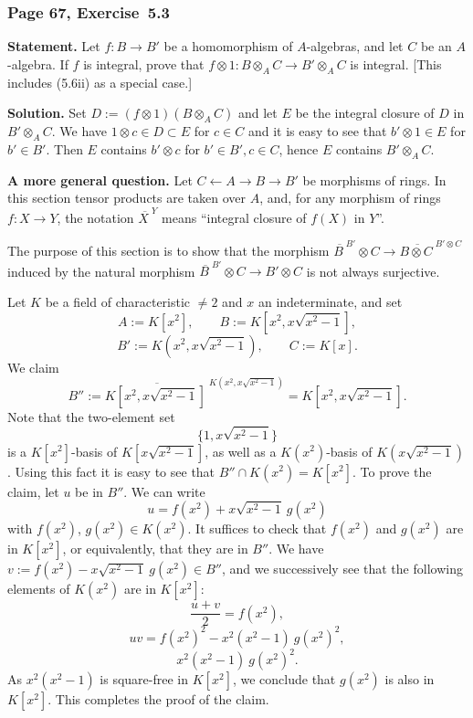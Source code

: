 \documentclass[12pt,letterpaper]{article}%
\newcommand{\nn}{\noindent}
\begin{document}
\subsubsection{Page 67, Exercise~5.3}\label{ex5.3}%

\textbf{Statement.} Let $f:B\to B'$ be a homomorphism of $A$-algebras, and let $C$ be an $A$-algebra. If $f$ is integral, prove that $f\otimes 1:B\otimes_AC\to B'\otimes_AC$ is integral. [This includes (5.6ii) as a special case.]

\nn\textbf{Solution.} Set $D:=(f\otimes1)(B\otimes_AC)$ and let $E$ be the integral closure of $D$ in $B'\otimes_AC$. We have $1\otimes c\in D\subset E$ for $c\in C$ and it is easy to see that $b'\otimes1\in E$ for $b'\in B'$. Then $E$ contains $b'\otimes c$ for $b'\in B',c\in C$, hence $E$ contains $B'\otimes_AC$.

\nn\textbf{A more general question.} Let $C\leftarrow A\to B\to B'$ be morphisms of rings. In this section tensor products are taken over $A$, and, for any morphism of rings $f:X\to Y$, the notation $\overline{X\ }^Y$ means ``integral closure of $f(X)$ in $Y$''. 

The purpose of this section is to show that the morphism $\overline{B\ }^{B'}\otimes C\to\overline{B\otimes C\ }^{B'\otimes C}$ induced by the natural morphism $\overline{B\ }^{B'}\otimes C\to B'\otimes C$ is not always surjective. 

Let $K$ be a field of characteristic $\ne2$ and $x$ an indeterminate, and set 
$$
A:=K[x^2],\qquad B:=K\left[x^2,x\sqrt{x^2-1}\right],
$$
$$
B':=K\left(x^2,x\sqrt{x^2-1}\right),\qquad C:=K[x].
$$ 
We claim 
$$
B'':=\overline{K\left[x^2,x\sqrt{x^2-1}\right]\ }^{K\left(x^2,x\sqrt{x^2-1}\right)}=K\left[x^2,x\sqrt{x^2-1}\right].
$$ 
Note that the two-element set 
$$
\{1,x\sqrt{x^2-1}\}
$$ 
is a $K[x^2]$-basis of $K[x\sqrt{x^2-1}]$, as well as a $K(x^2)$-basis of $K(x\sqrt{x^2-1})$. Using this fact it is easy to see that $B''\cap K(x^2)=K[x^2]$. To prove the claim, let $u$ be in $B''$. We can write 
$$
u=f(x^2)+x\sqrt{x^2-1}\ g(x^2)
$$ 
with $f(x^2)$, $g(x^2)\in K(x^2)$. It suffices to check that $f(x^2)$ and $g(x^2)$ are in $K[x^2]$, or equivalently, that they are in $B''$. We have $v:=f(x^2)-x\sqrt{x^2-1}\ g(x^2)\in B''$, and we successively see that the following elements of $K(x^2)$ are in $K[x^2]$: 
$$
\frac{u+v}2=f(x^2),
$$ 
$$
uv=f(x^2)^2-x^2(x^2-1)\ g(x^2)^2,
$$ 
$$
x^2(x^2-1)\ g(x^2)^2.
$$ 
As $x^2(x^2-1)$ is square-free in $K[x^2]$, we conclude that $g(x^2)$ is also in $K[x^2]$. This completes the proof of the claim. 
\end{document}
